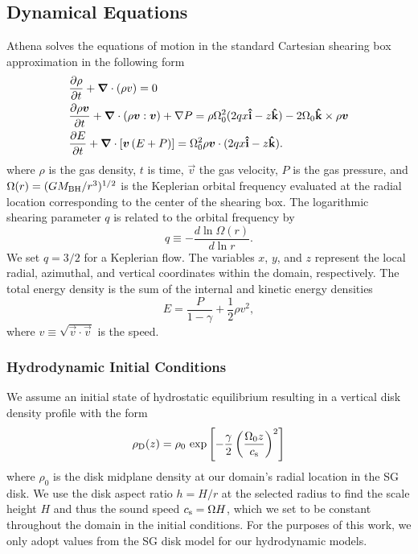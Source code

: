 \subsection{Dynamical Equations} \label{sec:dyn-eq}
Athena solves the equations of motion in the standard Cartesian shearing box approximation in the following form
\begin{align}
    &\frac{\partial{\rho}}{\partial{t}} + {\boldsymbol{\nabla}}\cdot{\left(\rho{\boldsymbol{}}{v}\right)} = 0
    \label{eqn:cons_mass} \\
    &\frac{\partial{\rho {\boldsymbol{v}}}}{\partial{t}} + {\boldsymbol{\nabla}}\cdot{\left(\rho {\boldsymbol{v}} : {\boldsymbol{v}}\right)} + \nabla P =
    \rho \Omega_{0}^{2}(2qx{\bf \hat{i}} - z{\bf \hat{k}}) - 2\Omega_{0} {\bf \hat{k}} \times \rho {\boldsymbol{v}}
    \label{eqn:cons_momentum} \\
    &\frac{\partial{E}}{\partial{t}} + {\boldsymbol{\nabla}}\cdot{\left[{\boldsymbol{v}}\left(E + P\right)\right]} =
    \Omega_{0}^{2}\rho{\boldsymbol{v}} \cdot (2qx{\bf \hat{i}} - z{\bf \hat{k}}).
    \label{eqn:cons_energy}
\end{align}
where $\rho$ is the gas density, $t$ is time, $\vec{v}$ the gas velocity, $P$ is the gas pressure, and $\Omega(r) = (GM_{\rm BH}/r^3)^{1/2}$ is the Keplerian orbital frequency evaluated at the radial location corresponding to the center of the shearing box.
The logarithmic shearing parameter $q$ is related to the orbital frequency by
\begin{equation}
    q \equiv -\frac{d\ln\Omega(r)}{d\ln r}.
\end{equation}
We set $q=3/2$ for a Keplerian flow.
The variables $x$, $y$, and $z$ represent the local radial, azimuthal, and vertical coordinates within the domain, respectively.
The total energy density is the sum of the internal and kinetic energy densities
\begin{equation}
    E = \frac{P}{1-\gamma} + \frac{1}{2}\rho v^2,
\end{equation}
where $v \equiv \sqrt{ \vec{v} \cdot \vec{v} }$ is the speed.


\subsubsection{Hydrodynamic Initial Conditions} \label{sec:ICs}

 \label{sec:disk-model}

We assume an initial state of hydrostatic equilibrium resulting in a vertical disk density profile with the form
\begin{equation} \label{eqn:disk-z-profile}
    \rho_{\rm D} (z) = \rho_0 \, \exp\left[-\frac{\gamma}{2} \left(\frac{\Omega_0 z}{c_{\rm s}}\right)^2 \right]
\end{equation}
where $\rho_0$ is the disk midplane density at our domain's radial location in the SG disk. We use the disk aspect ratio $h=H/r$ at the selected radius to find the scale height $H$ and thus the sound speed $c_{\rm s}=\Omega H$, which we set to be constant throughout the domain in the initial conditions.
For the purposes of this work, we only adopt values from the SG disk model for our hydrodynamic models.


